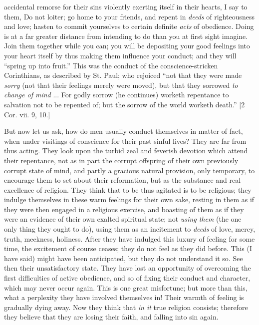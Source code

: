 accidental remorse for their sins violently exerting
itself in their hearts, I say to them, Do not loiter; go
home to your friends, and repent in \emph{deeds} of
righteousness and love; hasten to commit yourselves to
certain definite \emph{acts} of obedience. Doing is at a
far greater distance from intending to do than you at
first sight imagine. Join them together while you can;
you will be depositing your good feelings into your heart
itself by thus making them influence your conduct; and
they will ``spring up into fruit.'' This was the
conduct of the conscience-stricken Corinthians, as
described by St. Paul; who rejoiced ``not that they
were made \emph{sorry} (not that their feelings merely
were moved), but that they sorrowed \emph{to change of mind}
... For godly sorrow (he continues) worketh repentance to
salvation not to be repented of; but the sorrow of the
world worketh death.'' [2 Cor. vii. 9, 10.]

But now let us ask, how do men usually conduct
themselves in matter of fact, when under visitings of
conscience for their past sinful lives? They are far from
thus acting. They look upon the turbid zeal and feverish
devotion which attend their repentance, not as in part
the corrupt offspring of their own previously corrupt
state of mind, and partly a gracious natural provision,
only temporary, to encourage them to set about their
reformation, but as the substance and real excellence of
religion. They think that to be thus agitated is to be
religious; they indulge themselves in these warm feelings
for their own sake, resting in them as if they were then
engaged in a religious exercise, and boasting of them as
if they were an evidence of their own exalted spiritual
state; not \emph{using them} (the one only thing they
ought to do), using them as an incitement to \emph{deeds}
of love, mercy, truth, meekness, holiness. After they
have indulged this luxury of feeling for some time, the
excitement of course ceases; they do not feel as they did
before. This (I have said) might have been anticipated,
but they do not understand it so. See then their
unsatisfactory state. They have lost an opportunity of
overcoming the first difficulties of active obedience,
and so of fixing their conduct and character, which may never occur again. This is one great misfortune; but more
than this, what a perplexity they have involved
themselves in! Their warmth of feeling is gradually dying
away. Now they think that \emph{in it} true religion
consists; therefore they believe that they are losing
their faith, and falling into sin again.

